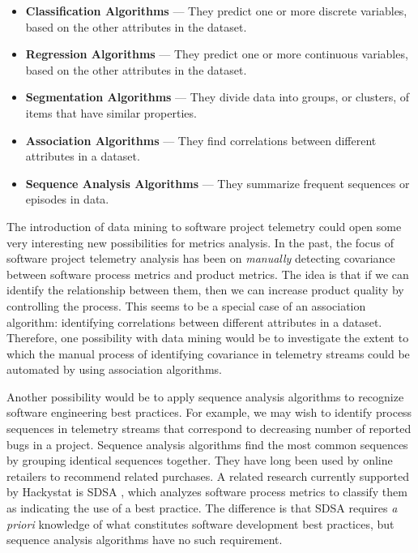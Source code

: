 \begin{itemize}
	\item \textbf{Classification Algorithms} --- They predict one or more discrete variables, based on the other attributes in the dataset. 

  \item \textbf{Regression Algorithms} --- They predict one or more continuous variables, based on the other attributes in the dataset.

  \item \textbf{Segmentation Algorithms} --- They divide data into groups, or clusters, of items that have similar properties.

  \item \textbf{Association Algorithms} --- They find correlations between different attributes in a dataset.

  \item \textbf{Sequence Analysis Algorithms} --- They summarize frequent sequences or episodes in data.
\end{itemize}

The introduction of data mining to software project telemetry could open some very interesting new possibilities for metrics analysis.
In the past, the focus of software project telemetry analysis has been on \textit{manually} detecting covariance between software process metrics and product metrics. The idea is that if we can identify the relationship between them, then we can increase product quality by controlling the process. This seems to be a special case of an association algorithm: identifying correlations between different attributes in a dataset. Therefore, one possibility with data mining would be to investigate the extent to which the manual process of identifying covariance in telemetry streams could be automated by using association algorithms.

Another possibility would be to apply sequence analysis algorithms to recognize software engineering best practices. For example, we may wish to identify process sequences in telemetry streams that correspond to decreasing number of reported bugs in a project. Sequence analysis algorithms find the most common sequences by grouping identical sequences together. They have long been used by online retailers to recommend related purchases. A related research currently supported by Hackystat is SDSA \cite{Kou:2006}, which analyzes software process metrics to classify them as indicating the use of a best practice. The difference is that SDSA requires \textit{a priori} knowledge of what constitutes software development best practices, but sequence analysis algorithms have no such requirement. 

